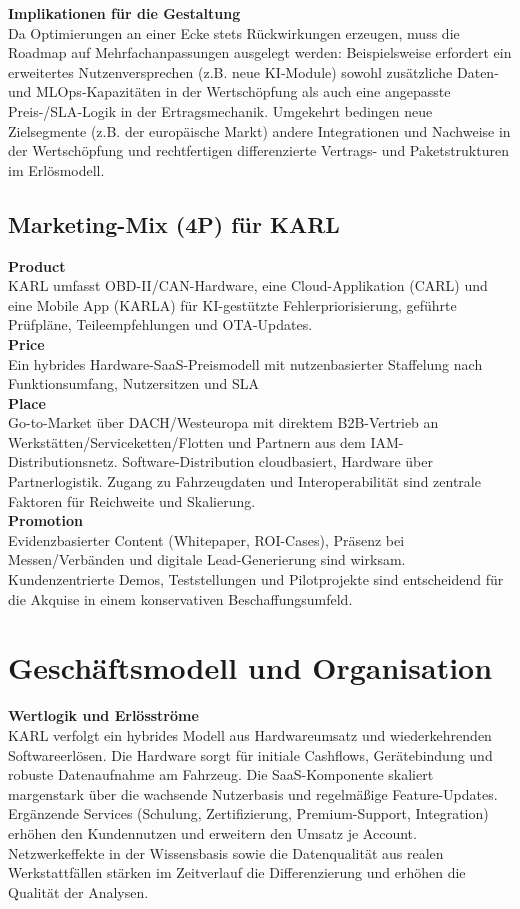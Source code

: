 \textbf{Implikationen für die Gestaltung} \\
Da Optimierungen an einer Ecke stets Rückwirkungen erzeugen, muss die Roadmap auf Mehrfachanpassungen ausgelegt werden: Beispielsweise erfordert ein erweitertes Nutzenversprechen (z.B. neue \ac{KI}‑Module) sowohl zusätzliche Daten- und MLOps‑Kapazitäten in der Wertschöpfung als auch eine angepasste Preis-/\ac{SLA}‑Logik in der Ertragsmechanik. Umgekehrt bedingen neue Zielsegmente (z.B. der europäische Markt) andere Integrationen und Nachweise in der Wertschöpfung und rechtfertigen differenzierte Vertrags- und Paketstrukturen im Erlösmodell.\\

\subsection{Marketing-Mix (4P) für KARL}
\textbf{Product}\\
\ac{KARL} umfasst \ac{OBD}-II/\ac{CAN}-Hardware, eine Cloud-Applikation (\ac{CARL}) und eine Mobile App (\ac{KARLA}) für \ac{KI}-gestützte Fehlerpriorisierung, geführte Prüfpläne, Teileempfehlungen und \ac{OTA}-Updates. \\
\textbf{Price}\\
Ein hybrides Hardware-SaaS-Preismodell mit nutzenbasierter Staffelung nach Funktionsumfang, Nutzersitzen und \ac{SLA}\\
\textbf{Place}\\
Go-to-Market über DACH/Westeuropa mit direktem \ac{B2B}-Vertrieb an Werkstätten/Serviceketten/Flotten und Partnern aus dem IAM-Distributionsnetz. Software-Distribution cloudbasiert, Hardware über Partnerlogistik. Zugang zu Fahrzeugdaten und Interoperabilität sind zentrale Faktoren für Reichweite und Skalierung.\\
\textbf{Promotion}\\
Evidenzbasierter Content (Whitepaper, ROI-Cases), Präsenz bei Messen/Verbänden und digitale Lead-Generierung sind wirksam. Kundenzentrierte Demos, Teststellungen und Pilotprojekte sind entscheidend für die Akquise in einem konservativen Beschaffungsumfeld.
\section{Geschäftsmodell und Organisation}
\textbf{Wertlogik und Erlösströme}\\
\ac{KARL} verfolgt ein hybrides Modell aus Hardwareumsatz und wiederkehrenden Softwareerlösen. Die Hardware sorgt für initiale Cashflows, Gerätebindung und robuste Datenaufnahme am Fahrzeug. Die SaaS-Komponente skaliert margenstark über die wachsende Nutzerbasis und regelmäßige Feature-Updates. Ergänzende Services (Schulung, Zertifizierung, Premium-Support, Integration) erhöhen den Kundennutzen und erweitern den Umsatz je Account. Netzwerkeffekte in der Wissensbasis sowie die Datenqualität aus realen Werkstattfällen stärken im Zeitverlauf die Differenzierung und erhöhen die Qualität der Analysen. \\

